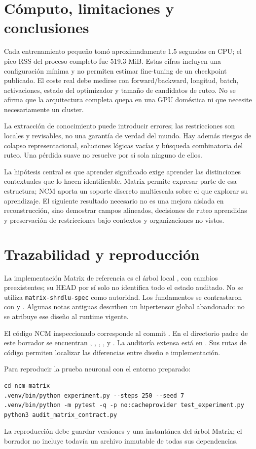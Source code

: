 \documentclass[11pt,a4paper]{article}
\begin{document}
\section{Cómputo, limitaciones y conclusiones}
Cada entrenamiento pequeño tomó aproximadamente 1.5 segundos en CPU; el pico
RSS del proceso completo fue 519.3 MiB. Estas cifras incluyen una configuración
mínima y no permiten estimar fine-tuning de un checkpoint publicado. El coste
real debe medirse con forward/backward, longitud, batch, activaciones, estado
del optimizador y tamaño de candidatos de ruteo. No se afirma que la arquitectura
completa quepa en una GPU doméstica ni que necesite necesariamente un cluster.

La extracción de conocimiento puede introducir errores; las restricciones son
locales y revisables, no una garantía de verdad del mundo. Hay además riesgos
de colapso representacional, soluciones lógicas vacías y búsqueda combinatoria
del ruteo. Una pérdida suave no resuelve por sí sola ninguno de ellos.

La hipótesis central es que aprender significado exige aprender las distinciones
contextuales que lo hacen identificable. Matrix permite expresar parte de esa
estructura; NCM aporta un soporte discreto multiescala sobre el que explorar
su aprendizaje. El siguiente resultado necesario no es una mejora aislada en
reconstrucción, sino demostrar campos alineados, decisiones de ruteo aprendidas
y preservación de restricciones bajo contextos y organizaciones no vistos.

\appendix
\section{Trazabilidad y reproducción}
La implementación Matrix de referencia es el árbol local
, con cambios preexistentes; su HEAD por sí solo no identifica
todo el estado auditado. No se utiliza \texttt{matrix-shrdlu-spec} como autoridad.
Los fundamentos se contrastaron con 
y . Algunas notas antiguas describen un hipertensor global
abandonado: no se atribuye ese diseño al runtime vigente.

El código NCM inspeccionado corresponde al commit
. En el directorio padre de este
borrador se encuentran , ,
, ,
 y .
La auditoría extensa está en . Sus rutas de código
permiten localizar las diferencias entre diseño e implementación.

Para reproducir la prueba neuronal con el entorno preparado:
\begin{verbatim}
cd ncm-matrix
.venv/bin/python experiment.py --steps 250 --seed 7
.venv/bin/python -m pytest -q -p no:cacheprovider test_experiment.py
python3 audit_matrix_contract.py
\end{verbatim}
La reproducción debe guardar versiones y una instantánea del árbol Matrix;
el borrador no incluye todavía un archivo inmutable de todas sus dependencias.



\end{document}
